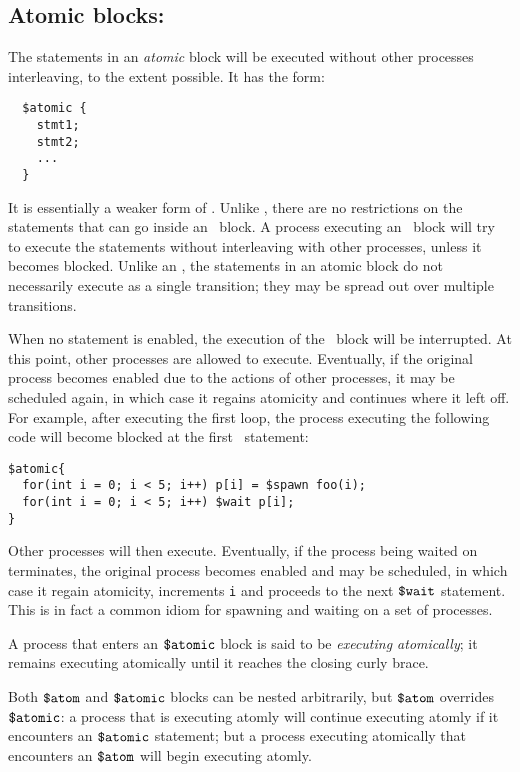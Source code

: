 \subsection{Atomic blocks: \catomic}

The statements in an \emph{atomic} block will be executed without
other processes interleaving, to the extent possible.  It has the
form:
\begin{verbatim}
  $atomic {
    stmt1;
    stmt2;
    ...
  }
\end{verbatim}
It is essentially a weaker form of \catom.  Unlike \catom, there are
no restrictions on the statements that can go inside an \catomic\
block.  A process executing an \catomic~block will try to execute the
statements without interleaving with other processes, unless it
becomes blocked.  Unlike an \catom, the statements in an atomic block
do not necessarily execute as a single transition; they may be spread
out over multiple transitions.

When no statement is enabled, the execution of the \catomic\ block
will be interrupted.  At this point, other processes are allowed to
execute.  Eventually, if the original process becomes enabled due to
the actions of other processes, it may be scheduled again, in which
case it regains atomicity and continues where it left off.  For
example, after executing the first loop, the process executing the
following code will become blocked at the first \cwait\ statement:
 \begin{verbatim}  
$atomic{
  for(int i = 0; i < 5; i++) p[i] = $spawn foo(i);
  for(int i = 0; i < 5; i++) $wait p[i];
}
\end{verbatim}
Other processes will then execute. Eventually, if the process being
waited on terminates, the original process becomes enabled and may be
scheduled, in which case it regain atomicity, increments \texttt{i}
and proceeds to the next $\mbox{\texttt{\${}wait}}$ statement.  This is in fact a common
idiom for spawning and waiting on a set of processes.

A process that enters an $\mbox{\texttt{\${}atomic}}$ block is said to be
\emph{executing atomically}; it remains executing atomically until it
reaches the closing curly brace.

Both $\mbox{\texttt{\${}atom}}$ and $\mbox{\texttt{\${}atomic}}$ blocks can be nested arbitrarily, but
$\mbox{\texttt{\${}atom}}$ overrides $\mbox{\texttt{\${}atomic}}$: a process that is executing atomly will
continue executing atomly if it encounters an $\mbox{\texttt{\${}atomic}}$ statement;
but a process executing atomically that encounters an $\mbox{\texttt{\${}atom}}$ will
begin executing atomly.

